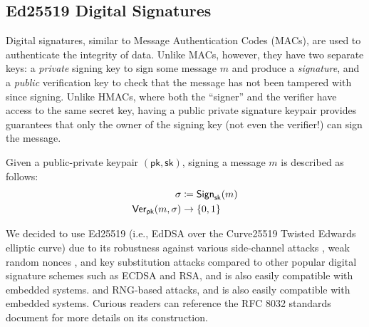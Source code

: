 \subsection{Ed25519 Digital Signatures}

Digital signatures, similar to Message Authentication Codes (MACs), are used to authenticate the integrity of data. Unlike MACs, however, they have two separate keys: a \emph{private} signing key to sign some message $m$ and produce a \textit{signature}, and a \emph{public} verification key to check that the message has not been tampered with since signing. 
\iflong
Unlike HMACs, where both the ``signer'' and the verifier have access to the same secret key, having a public private signature keypair provides guarantees that only the owner of the signing key (not even the verifier!) can sign the message.
\fi

Given a public-private keypair $(\mathsf{pk}, \mathsf{sk})$, signing a message $m$ is described as follows:
\begin{align*}
    \sigma &\coloneqq \mathsf{Sign}_{\mathsf{sk}}(m) \\
    \mathsf{Ver}_{\mathsf{pk}}(m, \sigma) &\to \{0,1\}
\end{align*}

We decided to use Ed25519 (i.e., EdDSA over the Curve25519 Twisted Edwards elliptic curve) due to its robustness against various side-channel attacks
\iflong
\cite{SSHSoK:OKBAK23}, weak random nonces \cite{rfc8032}, and key substitution attacks \cite{IEEESP:BCJZ21} compared to other popular digital signature schemes such as ECDSA and RSA, and is also easily compatible with embedded systems.
\else
and RNG-based attacks, and is also easily compatible with embedded systems.
\fi
Curious readers can reference the RFC 8032 standards document \cite{rfc8032} for more details on its construction.




